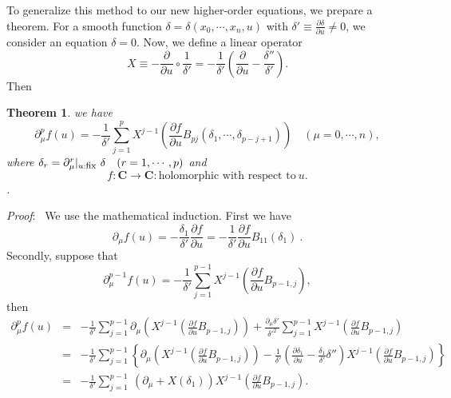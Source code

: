 \documentclass[makeidx,12pt,openany]{report}
\newtheorem{thm}[df]{Theorem}
\begin{document}
To generalize this method to our new higher-order equations, 
we prepare a theorem. For a smooth function 
$\delta=\delta(x_0,\cdots,x_n,u)$ with $\delta' \equiv 
\frac{\partial \delta}{\partial u} \ne 0$, 
we consider an equation $\delta =0$. 
Now, we define a linear operator 
\begin{equation}
 X \equiv -\frac{\partial}{\partial u} \circ \frac{1}{\delta'}
   = -\frac{1}{\delta'}\left( \frac{\partial}{\partial u}
       -\frac{\delta''}{\delta'} \right) .
\end{equation}
Then 
\begin{thm}
 we have
\begin{equation}
 \partial_{\mu}^p f(u) =
  -\frac{1}{\delta'} \sum_{j=1}^p X^{j-1}
   \left( \frac{\partial f}{\partial u}
     B_{pj}(\delta_1,\cdots,\delta_{p-j+1}) \right) \quad (\mu=0,\cdots,n),
\end{equation}
where $\delta_r=\partial_{\mu}^r|_{u:\mbox{\footnotesize{fix}}} 
\ \delta \quad (r=1,\cdots,p)$ and 
$$
f:{\mathbf{C}} \longrightarrow {\mathbf{C}}:\mbox{holomorphic with 
respect to} \ u.
$$. 
 \label{thm:implicit}
\end{thm}
{\it Proof}: \ 
We use the mathematical induction. First we have 
\begin{equation}
 \partial_{\mu}f(u) = -\frac{\delta_1}{\delta'}\frac{\partial f}{\partial u}
   = -\frac{1}{\delta'}\frac{\partial f}{\partial u}B_{11}(\delta_1) \ .
\end{equation}
Secondly, suppose that
\begin{equation}
 \partial_{\mu}^{p-1}f(u) =
  -\frac{1}{\delta'} \sum_{j=1}^{p-1} X^{j-1} 
    \left( \frac{\partial f}{\partial u}B_{p-1,j} \right),
\end{equation}
then
\begin{eqnarray*}
 \partial_{\mu}^p f(u) 
  &=& -\frac{1}{\delta'} \sum_{j=1}^{p-1} \partial_{\mu} 
       \left( X^{j-1} \left( 
         \frac{\partial f}{\partial u}B_{p-1,j} \right) \right)
      +\frac{\partial_{\mu}\delta'}{{\delta'}^2} 
       \sum_{j=1}^{p-1} X^{j-1} 
         \left( \frac{\partial f}{\partial u}B_{p-1,j} \right) \\
  &=& -\frac{1}{\delta'} \sum_{j=1}^{p-1} 
      \left\{ 
       \partial_{\mu} 
       \left( X^{j-1} \left( 
         \frac{\partial f}{\partial u}B_{p-1,j} \right) \right)
       -\frac{1}{\delta'}
       \left(
        \frac{\partial \delta_1}{\partial u}-\frac{\delta_1}{\delta'}\delta''
       \right) 
       X^{j-1} \left( \frac{\partial f}{\partial u}B_{p-1,j} \right)
      \right\} \\
  &=& -\frac{1}{\delta'} \sum_{j=1}^{p-1} \ 
     (\partial_{\mu}+X(\delta_1)) 
      X^{j-1} \left( \frac{\partial f}{\partial u}B_{p-1,j} \right).
\end{eqnarray*}
\end{document}
